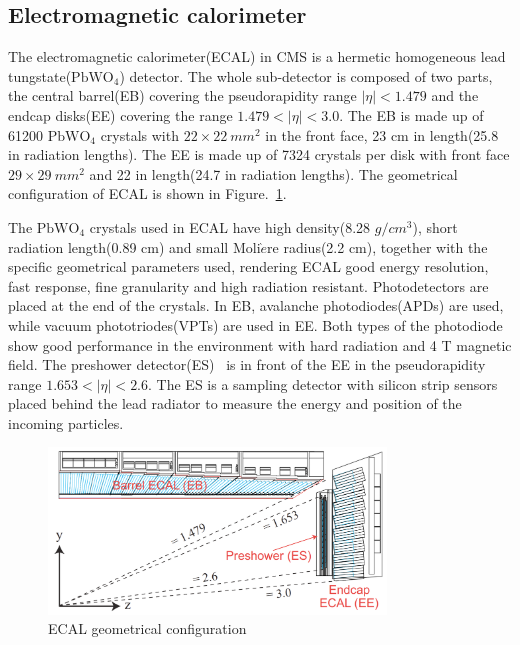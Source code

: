 \subsection{Electromagnetic calorimeter}

The electromagnetic calorimeter(ECAL) in CMS is a hermetic homogeneous lead tungstate($\textrm{PbWO}_{4}$) detector. The whole sub-detector is composed of two parts, the central barrel(EB) covering the pseudorapidity range $|\eta|<1.479$ and the endcap disks(EE) covering the range $1.479<|\eta|<3.0$. The EB is made up of 61200 $\textrm{PbWO}_{4}$ crystals with $22\times22~mm^{2}$ in the front face, 23 cm in length(25.8 in radiation lengths). The EE is made up of 7324 crystals per disk with front face $29\times29~mm^{2}$ and 22 in length(24.7 in radiation lengths). The geometrical configuration of ECAL is shown in Figure.~\ref{fig:ECAL_sketch}. 

The $\textrm{PbWO}_{4}$ crystals used in ECAL have high density(8.28 $g/cm^{3}$), short radiation length(0.89 cm) and small Moli$\grave{e}$re radius(2.2 cm), together with the specific geometrical parameters used, rendering ECAL  good energy resolution, fast response, fine granularity and high radiation resistant. Photodetectors are placed at the end of the crystals. In EB, avalanche photodiodes(APDs) are used, while vacuum phototriodes(VPTs) are used in EE. Both types of the photodiode show good performance in the environment with hard radiation and 4 T magnetic field. The preshower detector(ES)~\cite{CMS_TDR} is in front of the EE in the pseudorapidity range $1.653<|\eta|<2.6$. The ES is a sampling detector with silicon strip sensors placed behind the lead radiator to measure the energy and position of the incoming particles.  

\begin{figure}[htbp] 
\centering
\includegraphics[width=0.8\textwidth]{chapter3/ECAL_transverse.png}
\caption[ECAL geometrical configuration]{ECAL geometrical configuration~\cite{CMS_TDR}}
\label{fig:ECAL_sketch}
\end{figure}

